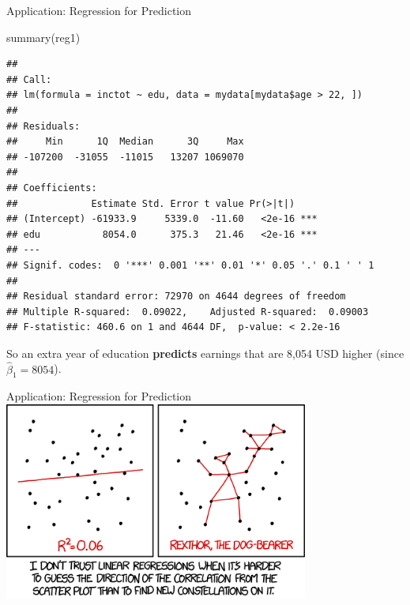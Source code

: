 \documentclass[
  ignorenonframetext,
]{beamer}
\newenvironment{Shaded}{\begin{snugshade}}{\end{snugshade}}
\newcommand{\FunctionTok}[1]{\textcolor[rgb]{0.00,0.00,0.00}{#1}}
\newcommand{\NormalTok}[1]{#1}
\begin{document}
\begin{frame}[fragile]{Application: Regression for Prediction}
\protect\hypertarget{application-regression-for-prediction-2}{}
\tiny

\begin{Shaded}
\begin{Highlighting}[]
\FunctionTok{summary}\NormalTok{(reg1)}
\end{Highlighting}
\end{Shaded}

\begin{verbatim}
## 
## Call:
## lm(formula = inctot ~ edu, data = mydata[mydata$age > 22, ])
## 
## Residuals:
##     Min      1Q  Median      3Q     Max 
## -107200  -31055  -11015   13207 1069070 
## 
## Coefficients:
##             Estimate Std. Error t value Pr(>|t|)    
## (Intercept) -61933.9     5339.0  -11.60   <2e-16 ***
## edu           8054.0      375.3   21.46   <2e-16 ***
## ---
## Signif. codes:  0 '***' 0.001 '**' 0.01 '*' 0.05 '.' 0.1 ' ' 1
## 
## Residual standard error: 72970 on 4644 degrees of freedom
## Multiple R-squared:  0.09022,    Adjusted R-squared:  0.09003 
## F-statistic: 460.6 on 1 and 4644 DF,  p-value: < 2.2e-16
\end{verbatim}

\normalsize

So an extra year of education \textbf{predicts} earnings that are 8,054
USD higher (since \(\hat{\beta}_1=8054\)).
\end{frame}

\begin{frame}{Application: Regression for Prediction}
\protect\hypertarget{application-regression-for-prediction-3}{}
\center \includegraphics[width=0.75\textwidth,height=\textheight]{"images/scatterintuitioncomic.png"}
\end{frame}
\end{document}
